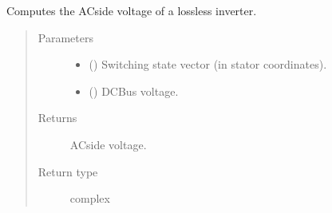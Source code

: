 \documentclass[letterpaper,10pt,english]{sphinxmanual}
\begin{document}
\begin{fulllineitems}
\label{\detokenize{model:model.converter.ac_voltage}}
\pysigstartsignatures
{}
\pysigstopsignatures
\sphinxAtStartPar
Computes the AC\sphinxhyphen{}side voltage of a lossless inverter.
\begin{quote}\begin{description}
\item[{Parameters}] \leavevmode\begin{itemize}
\item {} 
\sphinxAtStartPar
{} () \textendash{} Switching state vector (in stator coordinates).

\item {} 
\sphinxAtStartPar
{} () \textendash{} DC\sphinxhyphen{}Bus voltage.

\end{itemize}

\item[{Returns}] \leavevmode
\sphinxAtStartPar
{} \textendash{} AC\sphinxhyphen{}side voltage.

\item[{Return type}] \leavevmode
\sphinxAtStartPar
complex

\end{description}\end{quote}

\end{fulllineitems}

\end{document}
